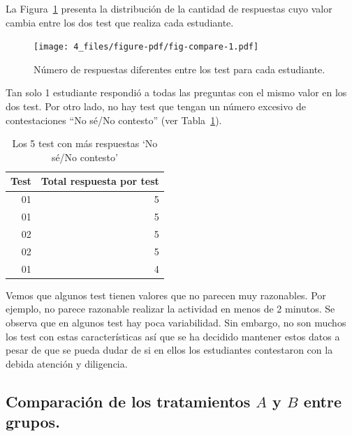 \documentclass[
  12pt,
  a4paper,
  extrafontsizes,
  onecolumn,
  openright]{memoir}
\begin{document}
La Figura~\ref{fig-compare} presenta la distribución de la cantidad de
respuestas cuyo valor cambia entre los dos test que realiza cada
estudiante.

\begin{figure}[h]

{\centering \texttt{[image: 4\_files/figure-pdf/fig-compare-1.pdf]}

}

\caption{\label{fig-compare}Número de respuestas diferentes entre los
test para cada estudiante.}

\end{figure}

Tan solo 1 estudiante respondió a todas las preguntas con el mismo valor
en los dos test. Por otro lado, no hay test que tengan un número
excesivo de contestaciones \enquote{No sé/No contesto} (ver
Tabla~\ref{tbl-noanswer}).

\hypertarget{tbl-noanswer}{}
\begin{longtable}{rr}
\caption{\label{tbl-noanswer}Los 5 test con más respuestas `No sé/No contesto' }\tabularnewline

\toprule
Test & Total respuesta por test \\ 
\midrule
01 & 5 \\ 
01 & 5 \\ 
02 & 5 \\ 
02 & 5 \\ 
01 & 4 \\ 
\bottomrule
\end{longtable}

Vemos que algunos test tienen valores que no parecen muy razonables. Por
ejemplo, no parece razonable realizar la actividad en menos de 2
minutos. Se observa que en algunos test hay poca variabilidad. Sin
embargo, no son muchos los test con estas características así que se ha
decidido mantener estos datos a pesar de que se pueda dudar de si en
ellos los estudiantes contestaron con la debida atención y diligencia.

\hypertarget{sec-eda-3}{%
\subsection{\texorpdfstring{Comparación de los tratamientos \(A\) y
\(B\) entre
grupos.}{Comparación de los tratamientos A y B entre grupos.}}\label{sec-eda-3}}
\end{document}
